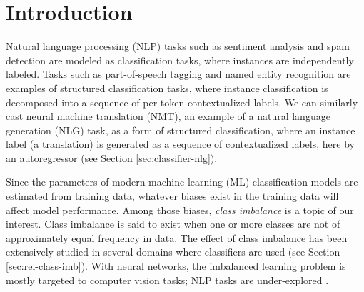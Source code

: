 \section{Introduction}

Natural language processing (NLP) tasks such as sentiment analysis \cite{maas-etal-2011-learning, Zhang-etal-15-cnn-sentiment} and spam detection are modeled as classification tasks, where instances are independently labeled.
Tasks such as part-of-speech tagging \cite{CoNLL2017-shared-UD} and named entity recognition \cite{CoNLL-2003-NER} are examples of structured classification tasks, where instance classification is decomposed into a sequence of per-token contextualized labels.
We can similarly cast neural machine translation (NMT), an example of a natural language generation (NLG) task, as a form of structured classification, where an instance label (a translation) is generated as a sequence of contextualized labels, here by an autoregressor (see Section \ref{sec:classifier-nlg}).

Since the parameters of modern machine learning (ML) classification models are estimated from training data, whatever biases exist in the training data will affect model performance.
Among those biases, \textit{class imbalance} is a topic of our interest.
Class imbalance is said to exist when one or more classes are not of approximately equal frequency in data.
The effect of class imbalance has been extensively studied in several domains where classifiers are used (see Section \ref{sec:rel-class-imb}).
With neural networks, the imbalanced learning problem is mostly targeted to computer vision tasks; NLP tasks are under-explored \cite{Johnson2019SurveyImbalance}. %

